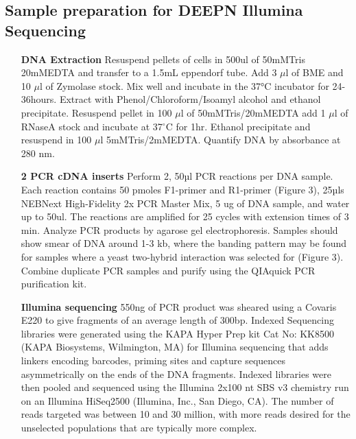 \documentclass[11pt,fleqn]{book} %
\begin{document}
\subsection{Sample preparation for DEEPN Illumina Sequencing}

\begin{enumerate}[leftmargin=1.4in]
    \item[\textbf{DNA Extraction}] Resuspend pellets of cells in 500ul of 50mMTris 20mMEDTA and transfer to a 1.5mL eppendorf tube. Add 3 $\mu$l of BME and 10 $\mu$l of Zymolase stock.  Mix well and incubate in the 37°C incubator for 24-36hours.  Extract with Phenol/Chloroform/Isoamyl alcohol and ethanol precipitate.  Resuspend pellet in 100 $\mu$l of 50mMTris/20mMEDTA add 1 $\mu$l of RNaseA stock and incubate at 37$^\circ$C for 1hr. Ethanol precipitate and resuspend in 100 $\mu$l 5mMTris/2mMEDTA.  Quantify DNA by absorbance at 280 nm.  
    \item[\textbf{2 PCR cDNA inserts}] Perform 2, 50µl PCR reactions per DNA sample.  Each reaction contains 50 pmoles F1-primer and R1-primer (Figure 3), 25µls NEBNext High-Fidelity 2x PCR Master Mix, 5 ug of DNA sample, and water up to 50ul. The reactions are amplified for 25 cycles with extension times of 3 min. Analyze PCR products by agarose gel electrophoresis.  Samples should show smear of DNA around 1-3 kb, where the banding pattern may be found for samples where a yeast two-hybrid interaction was selected for (Figure 3).  Combine duplicate PCR samples and purify using the QIAquick PCR purification kit.  
    \item[\textbf{Illumina sequencing}] 550ng of PCR product was sheared using a Covaris E220 to give fragments of an average length of 300bp. Indexed Sequencing libraries were generated using the KAPA Hyper Prep kit Cat No: KK8500 (KAPA Biosystems, Wilmington, MA) for Illumina sequencing that adds linkers encoding barcodes, priming sites and capture sequences asymmetrically on the ends of the DNA fragments. Indexed libraries were then pooled and sequenced using the Illumina 2x100 nt SBS v3 chemistry run on an Illumina HiSeq2500 (Illumina, Inc., San Diego, CA). The number of reads targeted was between 10 and 30 million, with more reads desired for the unselected populations that are typically more complex.
\end{enumerate}


\end{document}
